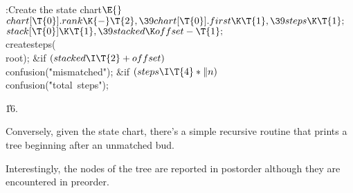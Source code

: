 \B{}:Create the state chart\X${}\E{}$\6
$\\{chart}[\T{0}].\\{rank}\K{-}\T{2},\39\\{chart}[\T{0}].\\{first}\K\T{1},\39%
\\{steps}\K\T{1};{}$\6
${}\\{stack}[\T{0}]\K\T{1},\39\\{stacked}\K\\{offset}-\T{1};{}$\6
\\{createsteps}(\\{root});\6
\&{if} ${}(\\{stacked}\I\T{2}+\\{offset}){}$\1\5
\\{confusion}(\.{"mismatched"});\2\6
\&{if} ${}(\\{steps}\I\T{4}*\|n){}$\1\5
\\{confusion}(\.{"total\ steps"});\2\par
\U16.\fi

Conversely, given the state chart, there's a
simple recursive routine
that prints a tree beginning after an unmatched bud.

Interestingly, the nodes of the tree are reported in postorder although
they are encountered in preorder.

